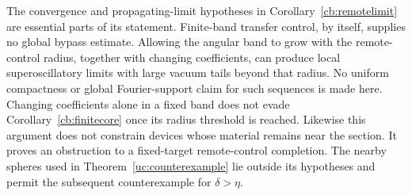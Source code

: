 \begin{remark}
\label{cb:remotescope}
The convergence and propagating-limit hypotheses in
Corollary~\ref{cb:remotelimit} are essential parts of its statement.
Finite-band transfer control, by itself, supplies no global bypass estimate.
Allowing the angular band to grow with the remote-control radius, together
with changing coefficients, can produce local superoscillatory limits with
large vacuum tails beyond that radius. No uniform compactness or global
Fourier-support claim for such sequences is made here. Changing coefficients
alone in a fixed band does not evade Corollary~\ref{cb:finitecore} once its
radius threshold is reached. Likewise this argument does not constrain
devices whose material remains near the section. It proves an obstruction
to a fixed-target remote-control completion. The nearby spheres used in
Theorem~\ref{uc:counterexample} lie outside its hypotheses and permit the
subsequent counterexample for $\delta>\eta$.
\end{remark}
